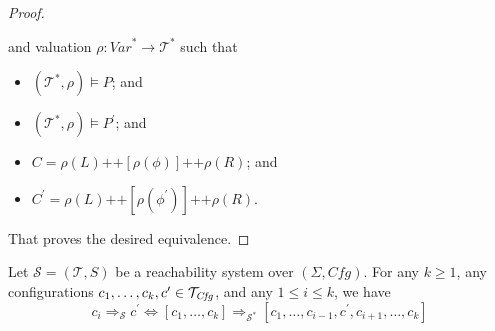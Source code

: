 \begin{proof}
\begin{proofenv}
    and valuation $\rho : \mathit{Var}^* \to \mathcal{T}^*$ such that
    \begin{itemize}
        \item $(\mathcal{T}^*, \rho) \vDash P$; and
        \item $(\mathcal{T}^*, \rho) \vDash P^\prime$; and
        \item $C = \rho(L) \texttt{++} [\rho(\phi)] \texttt{++} \rho(R)$; and
        \item $C^\prime = \rho(L)
        \texttt{++} [\rho(\phi^\prime)] \texttt{++} \rho(R)$.
    \end{itemize}
\end{proofenv}
That proves the desired equivalence.
\end{proof}


\begin{lemma}\label{lem:compositeStep}
    Let $\mathcal{S} = (\mathcal{T}, S)$ be a reachability system over $(\Sigma, \mathit{Cfg})$.
    For any $k \geq 1$, any configurations $c_1,\ldots,c_k, c^\prime \in \mathcal{T}_{\mathit{Cfg}}$, and any $1 \leq i \leq k$,
    we have
    \begin{equation*}
        c_i \Rightarrow_{\mathcal{S}} c^\prime
                    \iff
        [c_1,\ldots,c_k] \Rightarrow_{\mathcal{S}^*} [c_1, \ldots, c_{i-1}, c^\prime, c_{i+1}, \ldots, c_k]
    \end{equation*}
\end{lemma}
